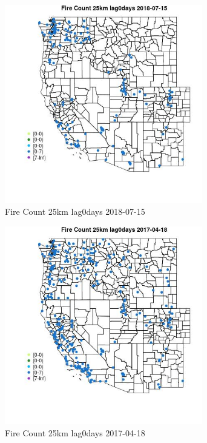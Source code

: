 \begin{figure} 
\centering  
\includegraphics[width=0.77\textwidth]{Code_Outputs/Report_ML_input_PM25_Step4_part_e_de_duplicated_aves_compiled_2019-05-21wNAs_MapObsFire_Count_25km_lag0days2018-07-15.jpg} 
\caption{\label{fig:Report_ML_input_PM25_Step4_part_e_de_duplicated_aves_compiled_2019-05-21wNAsMapObsFire_Count_25km_lag0days2018-07-15}Fire Count 25km lag0days 2018-07-15} 
\end{figure} 
 

\begin{figure} 
\centering  
\includegraphics[width=0.77\textwidth]{Code_Outputs/Report_ML_input_PM25_Step4_part_e_de_duplicated_aves_compiled_2019-05-21wNAs_MapObsFire_Count_25km_lag0days2017-04-18.jpg} 
\caption{\label{fig:Report_ML_input_PM25_Step4_part_e_de_duplicated_aves_compiled_2019-05-21wNAsMapObsFire_Count_25km_lag0days2017-04-18}Fire Count 25km lag0days 2017-04-18} 
\end{figure} 
 

